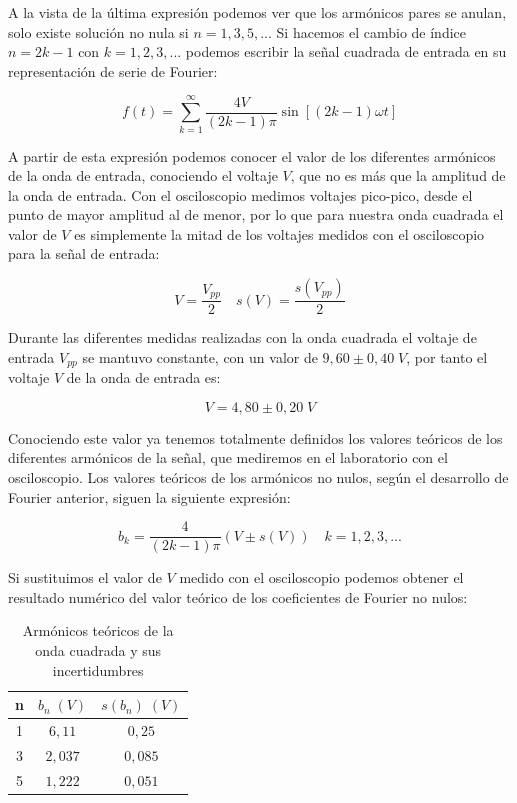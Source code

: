\documentclass[a4paper,12pt,titlepage]{article}
\begin{document}
A la vista de la última expresión podemos ver que los armónicos pares se anulan, solo existe solución no nula si $n=1,3,5,...$ Si hacemos el cambio de índice $n=2k-1$ con $k=1,2,3,...$ podemos escribir la señal cuadrada de entrada en su representación de serie de Fourier:

\begin{equation}
    f(t) = \sum_{k=1}^{\infty} \frac{4V}{(2k-1)\pi} \sin [(2k-1)\omega t]
\end{equation}

A partir de esta expresión podemos conocer el valor de los diferentes armónicos de la onda de entrada, conociendo el voltaje $V$, que no es más que la amplitud de la onda de entrada. Con el osciloscopio medimos voltajes pico-pico, desde el punto de mayor amplitud al de menor, por lo que para nuestra onda cuadrada el valor de $V$ es simplemente la mitad de los voltajes medidos con el osciloscopio para la señal de entrada:

\begin{equation}
    V = \frac{V_{pp}}{2} \quad s(V) = \frac{s(V_{pp})}{2}
\end{equation}

Durante las diferentes medidas realizadas con la onda cuadrada el voltaje de entrada $V_{pp}$ se mantuvo constante, con un valor de $9,60 \pm 0,40 \;V$, por tanto el voltaje $V$ de la onda de entrada es:

\begin{equation}
    V = 4,80 \pm 0,20 \;V
\end{equation}

Conociendo este valor ya tenemos totalmente definidos los valores teóricos de los diferentes armónicos de la señal, que mediremos en el laboratorio con el osciloscopio. Los valores teóricos de los armónicos no nulos, según el desarrollo de Fourier anterior, siguen la siguiente expresión:

\begin{equation}
    b_k = \frac{4}{(2k-1)\pi} (V \pm s(V)) \quad k=1,2,3,...
\end{equation}

Si sustituimos el valor de $V$ medido con el osciloscopio podemos obtener el resultado numérico del valor teórico de los coeficientes de Fourier no nulos:

\begin{table}[h!]
\centering
\begin{tabular}{|c|c|c|}
\hline
n & $b_n \;(V)$ & $s(b_n) \;(V)$ \\ \hline
1 & $6,11$ & $0,25$ \\ \hline
3 & $2,037$ & $0,085$ \\ \hline
5 & $1,222$ & $0,051$ \\ \hline
\end{tabular}
\caption{Armónicos teóricos de la onda cuadrada y sus incertidumbres}
\label{tab:my-table}
\end{table}
\end{document}
